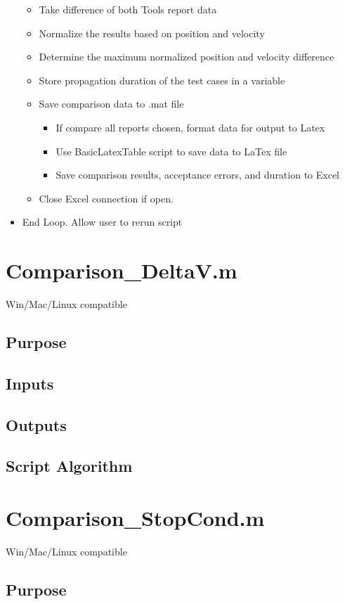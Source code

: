 \begin{itemize}
\begin{itemize}
        \item Take difference of both Tools report data
        \item Normalize the results based on position and velocity
        \item Determine the maximum normalized position and velocity
        difference
        \item Store propagation duration of the test cases in a
        variable
        \item Save comparison data to .mat file
        \begin{itemize}
            \item If compare all reports chosen, format data for
            output to Latex
            \item Use BasicLatexTable script to save data to LaTex
            file
            \item Save comparison results, acceptance errors, and
            duration to Excel
        \end{itemize}
        \item Close Excel connection if open.
    \end{itemize}
    \item End Loop. Allow user to rerun script
\end{itemize}

\section{Comparison\_DeltaV.m}
Win/Mac/Linux compatible
\subsection{Purpose}
\subsection{Inputs}
\subsection{Outputs}
\subsection{Script Algorithm}

\section{Comparison\_StopCond.m}
Win/Mac/Linux compatible
\subsection{Purpose}
